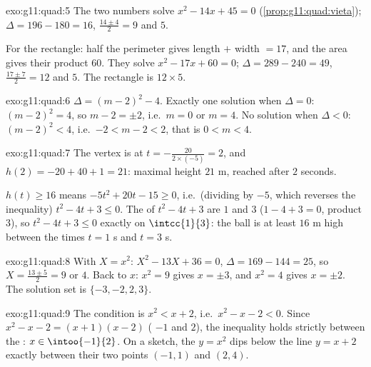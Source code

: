 \begin{solution}{exo:g11:quad:5}
The two numbers solve $x^2 - 14x + 45 = 0$ (\cref{prop:g11:quad:vieta});
$\Delta = 196 - 180 = 16$,  $\frac{14 \pm 4}{2} = 9$ and $5$.

For the rectangle: half the perimeter gives length $+$ width $= 17$, and
the area gives their product $60$. They solve $x^2 - 17x + 60 = 0$;
$\Delta = 289 - 240 = 49$,  $\frac{17 \pm 7}{2} = 12$ and $5$. The
rectangle is $12 \times 5$.
\end{solution}

\begin{solution}{exo:g11:quad:6}
$\Delta = (m-2)^2 - 4$. Exactly one solution when $\Delta = 0$:
$(m-2)^2 = 4$, so $m - 2 = \pm 2$, i.e.\ $m = 0$ or $m = 4$. No solution
when $\Delta < 0$: $(m-2)^2 < 4$, i.e.\ $-2 < m - 2 < 2$, that is
$0 < m < 4$.
\end{solution}

\begin{solution}{exo:g11:quad:7}
The vertex is at $t = -\frac{20}{2 \times (-5)} = 2$, and
$h(2) = -20 + 40 + 1 = 21$: maximal height $21$ m, reached after $2$
seconds.

$h(t) \geq 16$ means $-5t^2 + 20t - 15 \geq 0$, i.e.\ (dividing by $-5$,
which reverses the inequality) $t^2 - 4t + 3 \leq 0$. The  of
$t^2-4t+3$ are $1$ and $3$ ($1 - 4 + 3 = 0$, product $3$), so
$t^2 - 4t + 3 \leq 0$ exactly on $\intcc{1}{3}$: the ball is at least
$16$ m high between the times $t = 1$ s and $t = 3$ s.
\end{solution}

\begin{solution}{exo:g11:quad:8}
With $X = x^2$: $X^2 - 13X + 36 = 0$, $\Delta = 169 - 144 = 25$, so
$X = \frac{13 \pm 5}{2} = 9$ or $4$. Back to $x$: $x^2 = 9$ gives
$x = \pm 3$, and $x^2 = 4$ gives $x = \pm 2$. The solution set is
$\{-3, -2, 2, 3\}$.
\end{solution}

\begin{solution}{exo:g11:quad:9}
The condition is $x^2 < x + 2$, i.e.\ $x^2 - x - 2 < 0$. Since
$x^2 - x - 2 = (x+1)(x-2)$ ( $-1$ and $2$), the inequality holds
strictly between the : $x \in \intoo{-1}{2}$. On a sketch, the
 $y = x^2$ dips below the line $y = x+2$ exactly between their two
 points $(-1, 1)$ and $(2, 4)$.
\end{solution}

